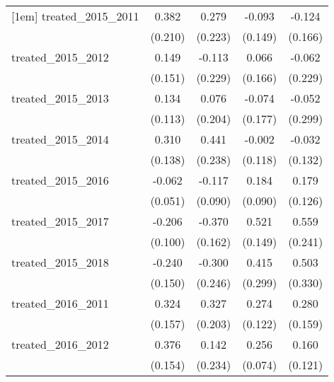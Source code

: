 {\begin{tabular}{l*{4}{c}}
[1em]
treated\_2015\_2011&       0.382         &       0.279         &      -0.093         &      -0.124         \\
            &     (0.210)         &     (0.223)         &     (0.149)         &     (0.166)         \\
[1em]
treated\_2015\_2012&       0.149         &      -0.113         &       0.066         &      -0.062         \\
            &     (0.151)         &     (0.229)         &     (0.166)         &     (0.229)         \\
[1em]
treated\_2015\_2013&       0.134         &       0.076         &      -0.074         &      -0.052         \\
            &     (0.113)         &     (0.204)         &     (0.177)         &     (0.299)         \\
[1em]
treated\_2015\_2014&       0.310\sym{*}  &       0.441         &      -0.002         &      -0.032         \\
            &     (0.138)         &     (0.238)         &     (0.118)         &     (0.132)         \\
[1em]
treated\_2015\_2016&      -0.062         &      -0.117         &       0.184\sym{*}  &       0.179         \\
            &     (0.051)         &     (0.090)         &     (0.090)         &     (0.126)         \\
[1em]
treated\_2015\_2017&      -0.206\sym{*}  &      -0.370\sym{*}  &       0.521\sym{***}&       0.559\sym{*}  \\
            &     (0.100)         &     (0.162)         &     (0.149)         &     (0.241)         \\
[1em]
treated\_2015\_2018&      -0.240         &      -0.300         &       0.415         &       0.503         \\
            &     (0.150)         &     (0.246)         &     (0.299)         &     (0.330)         \\
[1em]
treated\_2016\_2011&       0.324\sym{*}  &       0.327         &       0.274\sym{*}  &       0.280         \\
            &     (0.157)         &     (0.203)         &     (0.122)         &     (0.159)         \\
[1em]
treated\_2016\_2012&       0.376\sym{*}  &       0.142         &       0.256\sym{***}&       0.160         \\
            &     (0.154)         &     (0.234)         &     (0.074)         &     (0.121)         \\

\end{tabular}}

